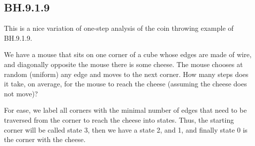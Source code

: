 \subsection{BH.9.1.9}
\label{sec:bh.9.1.9}

This is a nice variation of one-step analysis of the coin throwing example of BH.9.1.9.

We have a mouse that sits on one corner of a cube whose edges are made of wire, and  diagonally opposite the mouse there is some cheese.
The mouse chooses at random (uniform) any edge and moves to the next corner.
How many steps does it take, on average, for the mouse to reach the cheese (assuming the cheese does not move)?

For ease, we label all corners with the minimal number of edges that need to be traversed from the corner to reach the cheese into states. Thus, the starting corner will be called state 3, then we have a state 2, and 1, and finally state 0 is the corner with the cheese.

